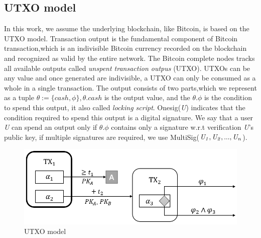 \documentclass[conference]{IEEEtran}
\begin{document}
\subsection{UTXO model}

In this work, we assume the underlying blockchain, like Bitcoin, is based on the UTXO model. Transaction output is the fundamental 
component of Bitcoin transaction,which is an indivisible Bitcoin currency recorded on the blockchain and recognized as valid by 
the entire network. The Bitcoin complete nodes tracks all available outputs called \emph{unspent transaction outpus} (UTXO). 
UTXOs can be any value and once generated are indivisible, a UTXO can only be consumed as a whole in a single transaction. 
The output consists of two parts,which we represent as a tuple $\theta :=\{cash,\phi\}, \theta.cash$ is the output value,
 and the $\theta.\phi$ is the condition to spend this output, it also called \emph{locking script}. Onesig(\emph{U}) indicates 
 that the condition required to spend this output is a digital signature. We say that a user \emph{U} can spend an output only if
 $\theta.\phi$ contains only a signature w.r.t verification \emph{U}'s public key, if multiple signatures are required, we use 
 MultiSig($\it U_1,U_2,...,U_n$).

 \begin{figure}[htbp]
    \centering
    \includegraphics[scale=0.4]{fig2.png}
    \caption{UTXO model}
 \end{figure}
\end{document}

